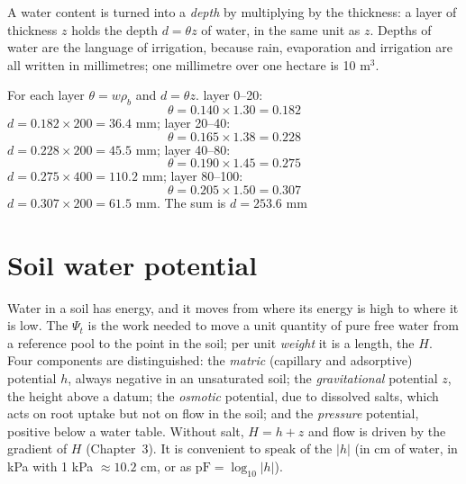 A water content is turned into a \emph{depth} by multiplying by the thickness: a layer of thickness $z$ holds the depth $d=\theta z$ of water, in the same unit as $z$. Depths of water are the language of irrigation, because rain, evaporation and irrigation are all written in millimetres; one millimetre over one hectare is 10 m$^3$.

\sol {}\ans For each layer $\theta=w\rho_b$ and $d=\theta z$. layer 0--20: \[\theta=0.140\times1.30=0.182\]
$d=0.182\times200=36.4$ mm; layer 20--40: \[\theta=0.165\times1.38=0.228\]
$d=0.228\times200=45.5$ mm; layer 40--80: \[\theta=0.190\times1.45=0.275\]
$d=0.275\times400=110.2$ mm; layer 80--100: \[\theta=0.205\times1.50=0.307\]
$d=0.307\times200=61.5$ mm. The sum is $d=253.6$ mm \finans

\section{Soil water potential}
Water in a soil has energy, and it moves from where its energy is high to where it is low. The  $\Psi_t$ is the work needed to move a unit quantity of pure free water from a reference pool to the point in the soil; per unit \emph{weight} it is a length, the  $H$. Four components are distinguished: the \emph{matric} (capillary and adsorptive) potential $h$, always negative in an unsaturated soil; the \emph{gravitational} potential $z$, the height above a datum; the \emph{osmotic} potential, due to dissolved salts, which acts on root uptake but not on flow in the soil; and the \emph{pressure} potential, positive below a water table. Without salt, $H=h+z$ and flow is driven by the gradient of $H$ (Chapter~3). It is convenient to speak of the  $|h|$ (in cm of water, in kPa with 1 kPa $\approx 10.2$ cm, or as $\mathrm{pF}=\log_{10}|h|$).


